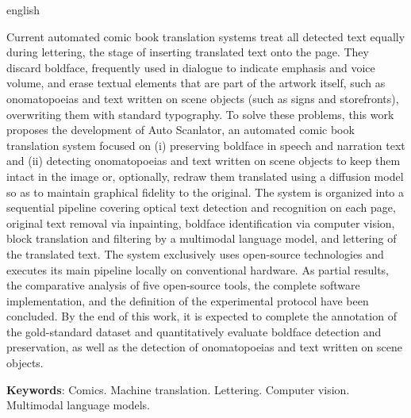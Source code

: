\documentclass[
    12pt,
    openright,
    oneside,
    a4paper,
    chapter=TITLE,
    section=TITLE,
    english,
    brazilian,
    brazil
]{abntex2}
\begin{document}
\begin{otherlanguage*}{english}
\begin{resumo}[Abstract]
\SingleSpacing
Current automated comic book translation systems treat all detected text equally during lettering, the stage of inserting translated text onto the page. They discard boldface, frequently used in dialogue to indicate emphasis and voice volume, and erase textual elements that are part of the artwork itself, such as onomatopoeias and text written on scene objects (such as signs and storefronts), overwriting them with standard typography. To solve these problems, this work proposes the development of Auto Scanlator, an automated comic book translation system focused on (i) preserving boldface in speech and narration text and (ii) detecting onomatopoeias and text written on scene objects to keep them intact in the image or, optionally, redraw them translated using a diffusion model so as to maintain graphical fidelity to the original. The system is organized into a sequential pipeline covering optical text detection and recognition on each page, original text removal via inpainting, boldface identification via computer vision, block translation and filtering by a multimodal language model, and lettering of the translated text. The system exclusively uses open-source technologies and executes its main pipeline locally on conventional hardware. As partial results, the comparative analysis of five open-source tools, the complete software implementation, and the definition of the experimental protocol have been concluded. By the end of this work, it is expected to complete the annotation of the gold-standard dataset and quantitatively evaluate boldface detection and preservation, as well as the detection of onomatopoeias and text written on scene objects.

\textbf{Keywords}: Comics. Machine translation. Lettering. Computer vision. Multimodal language models.
\end{resumo}
\end{otherlanguage*}
\cleardoublepage

\begingroup
\hypersetup{hidelinks}

{\renewcommand{\addvspace}[1]{}\listoffigures*}
\cleardoublepage

{\renewcommand{\addvspace}[1]{}\listoftables*}
\cleardoublepage

\begin{KeepFromToc}
    \raggedbottom
    \tableofcontents*
\end{KeepFromToc}
\cleardoublepage
\endgroup
\end{document}
